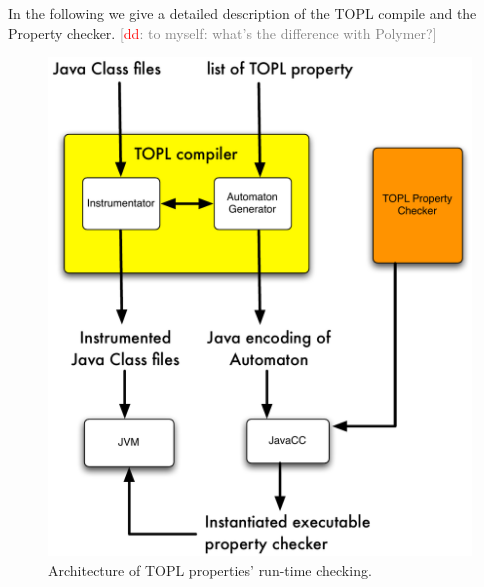 \documentclass[10pt]{llncs} %
\newcommand{\noterg}[2]{\textcolor{gray}{[\textcolor{red}{#1}: #2]}}
\newcommand{\dd}[1]{\noterg{dd}{#1}}
\newcommand{\dinocomment}[1]{\dd{#1}}
\begin{document}
In the following we give a detailed description of the TOPL compile and the Property checker.
\dinocomment{to myself: what's the difference with Polymer?}
%
\begin{figure}[htbp]
\begin{center}
\includegraphics[scale=.35]{TOPL.pdf}
\caption{Architecture of TOPL properties' run-time checking.}
\label{architecture}
\end{center}
\end{figure}
\end{document}

